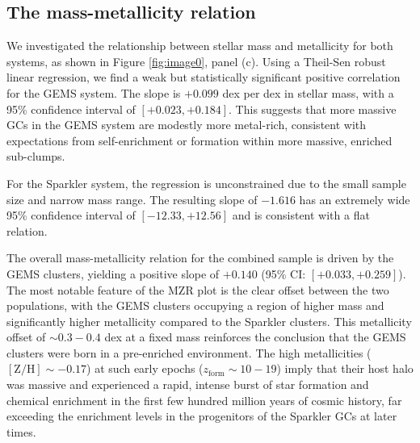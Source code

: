 \documentclass[]{article}
\begin{document}
\subsection{The mass-metallicity relation}

We investigated the relationship between stellar mass and metallicity for both systems, as shown in Figure \ref{fig:image0}, panel (c). Using a Theil-Sen robust linear regression, we find a weak but statistically significant positive correlation for the GEMS system. The slope is $+0.099$ dex per dex in stellar mass, with a 95\% confidence interval of $[+0.023, +0.184]$. This suggests that more massive GCs in the GEMS system are modestly more metal-rich, consistent with expectations from self-enrichment or formation within more massive, enriched sub-clumps.

For the Sparkler system, the regression is unconstrained due to the small sample size and narrow mass range. The resulting slope of $-1.616$ has an extremely wide 95\% confidence interval of $[-12.33, +12.56]$ and is consistent with a flat relation.

The overall mass-metallicity relation for the combined sample is driven by the GEMS clusters, yielding a positive slope of $+0.140$ (95\% CI: $[+0.033, +0.259]$). The most notable feature of the MZR plot is the clear offset between the two populations, with the GEMS clusters occupying a region of higher mass and significantly higher metallicity compared to the Sparkler clusters. This metallicity offset of $\sim 0.3-0.4$ dex at a fixed mass reinforces the conclusion that the GEMS clusters were born in a pre-enriched environment. The high metallicities ($[\mathrm{Z/H}] \sim -0.17$) at such early epochs ($z_\mathrm{form} \sim 10-19$) imply that their host halo was massive and experienced a rapid, intense burst of star formation and chemical enrichment in the first few hundred million years of cosmic history, far exceeding the enrichment levels in the progenitors of the Sparkler GCs at later times.
\end{document}

